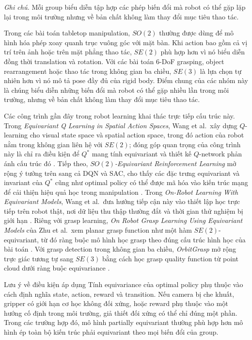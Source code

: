 \noindent\textit{Ghi chú.} Mỗi group biểu diễn tập hợp các phép biến đổi mà robot có thể gặp lặp lại trong môi trường nhưng về bản chất không làm thay đổi mục tiêu thao tác.

Trong các bài toán tabletop manipulation, $SO(2)$ thường được dùng để mô hình hóa phép xoay quanh trục vuông góc với mặt bàn. Khi action bao gồm cả vị trí trên ảnh hoặc trên mặt phẳng thao tác, $SE(2)$ phù hợp hơn vì nó biểu diễn đồng thời translation và rotation. Với các bài toán 6-DoF grasping, object rearrangement hoặc thao tác trong không gian ba chiều, $SE(3)$ là lựa chọn tự nhiên hơn vì nó mô tả pose đầy đủ của rigid body. Điểm chung của các nhóm này là chúng biểu diễn những biến đổi mà robot có thể gặp nhiều lần trong môi trường, nhưng về bản chất không làm thay đổi mục tiêu thao tác.

Các công trình gần đây trong robot learning khai thác trực tiếp cấu trúc này. Trong \textit{Equivariant Q Learning in Spatial Action Spaces}, Wang et al.\ xây dựng $Q$-learning cho visual state space và spatial action space, trong đó action của robot nằm trong không gian liên hệ với $SE(2)$; đóng góp quan trọng của công trình này là chỉ ra điều kiện để $Q^*$ mang tính equivariant và thiết kế $Q$-network phản ánh cấu trúc đó \cite{wang2021equivariant}. Tiếp theo, \textit{$SO(2)$-Equivariant Reinforcement Learning} mở rộng ý tưởng trên sang cả DQN và SAC, cho thấy các đặc trưng equivariant và invariant của $Q^*$ cũng như optimal policy có thể được mã hóa vào kiến trúc mạng để cải thiện hiệu quả học trong manipulation \cite{wang2022so2}. Trong \textit{On-Robot Learning With Equivariant Models}, Wang et al.\ đưa hướng tiếp cận này vào thiết lập học trực tiếp trên robot thật, nơi dữ liệu thu thập thường đắt và thời gian thử nghiệm bị giới hạn \cite{wang2022onrobot}. Riêng với grasp learning, \textit{On Robot Grasp Learning Using Equivariant Models} của Zhu et al.\ xem planar grasp function như một hàm $SE(2)$-equivariant, từ đó ràng buộc mô hình học grasp theo đúng cấu trúc hình học của bài toán \cite{zhu2023robot}. Với grasp detection trong không gian ba chiều, \textit{OrbitGrasp} mở rộng trực giác tương tự sang $SE(3)$ bằng cách học grasp quality function từ point cloud dưới ràng buộc equivariance \cite{hu2024orbitgrasp}.

\begin{WarningBox}{Lưu ý về điều kiện áp dụng}
Tính equivariance của optimal policy phụ thuộc vào cách định nghĩa state, action, reward và transition. Nếu camera bị che khuất, gripper có giới hạn cơ học không đối xứng, hoặc reward phụ thuộc vào một hướng cố định trong môi trường, giả thiết đối xứng có thể chỉ đúng một phần. Trong các trường hợp đó, mô hình partially equivariant thường phù hợp hơn mô hình ép toàn bộ kiến trúc phải equivariant theo mọi biến đổi của group.
\end{WarningBox}

